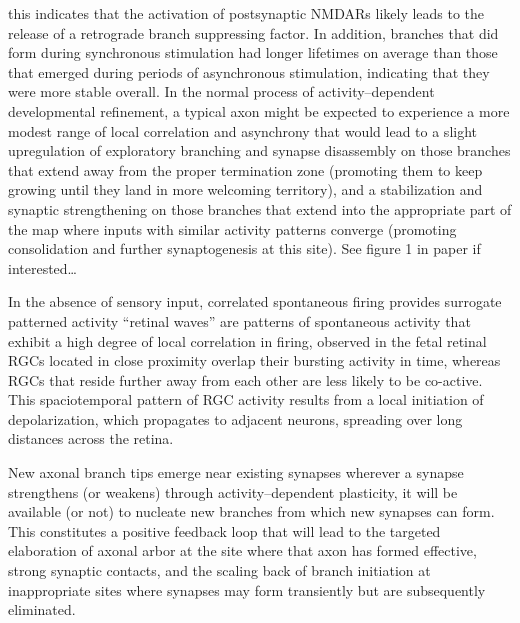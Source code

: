 \documentclass[11pt, a4paper, oneside]{article}   	%
\begin{document}
\begin{outline}
            \supersubpoint this indicates that the activation of postsynaptic NMDARs likely leads to the release of a retrograde branch suppressing factor. In addition, branches that did form during synchronous stimulation had longer lifetimes on average than those that emerged during periods of asynchronous stimulation, indicating that they were more stable overall.
        \subsubpoint In the normal process of activity--dependent developmental refinement, a typical axon might be expected to experience a more modest range of local correlation and asynchrony that would lead to a slight upregulation of exploratory branching and synapse disassembly on those branches that extend away from the proper termination zone (promoting them to keep growing until they land in more welcoming territory), and a stabilization and synaptic strengthening on those branches that extend into the appropriate part of the map where inputs with similar activity patterns converge (promoting consolidation and further synaptogenesis at this site). See figure 1 in paper if interested\ldots
    
 \point In the absence of sensory input, correlated spontaneous firing provides surrogate patterned activity
    \subpoint ``retinal waves'' are patterns of spontaneous activity that exhibit a high degree of local correlation in firing, observed in the fetal retinal
    \subpoint RGCs located in close proximity overlap their bursting activity in time, whereas RGCs that reside further away from each other are less likely to be co-active. This spaciotemporal pattern of RGC activity results from a local initiation of depolarization, which propagates to adjacent neurons, spreading over long distances across the retina.
  
 \point New axonal branch tips emerge near existing synapses
    \subpoint wherever a synapse strengthens (or weakens) through activity--dependent plasticity, it will be available (or not) to nucleate new branches from which new synapses can form.
        \subsubpoint This constitutes a positive feedback loop that will lead to the targeted elaboration of axonal arbor at the site where that axon has formed effective, strong synaptic contacts, and the scaling back of branch initiation at inappropriate sites where synapses may form transiently but are subsequently eliminated.


\end{outline}
\end{document}
